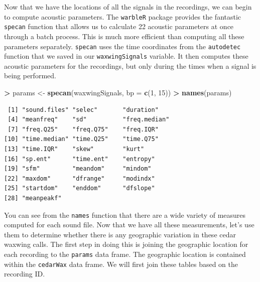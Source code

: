 \documentclass[]{krantz}
\makeatletter
\newenvironment{Shaded}{\begin{snugshade}}{\end{snugshade}}
\newcommand{\CharTok}[1]{\textcolor[rgb]{0.5,0.5,0.5}{#1}}
\newcommand{\DataTypeTok}[1]{\textcolor[rgb]{0.27,0.27,0.27}{#1}}
\newcommand{\DecValTok}[1]{\textcolor[rgb]{0.06,0.06,0.06}{#1}}
\newcommand{\KeywordTok}[1]{\textcolor[rgb]{0.27,0.27,0.27}{\textbf{#1}}}
\newcommand{\NormalTok}[1]{#1}
\newcommand{\OperatorTok}[1]{\textcolor[rgb]{0.43,0.43,0.43}{\textbf{#1}}}
\newcommand{\StringTok}[1]{\textcolor[rgb]{0.5,0.5,0.5}{#1}}
\newenvironment{kframe}{%
\medskip{}
\setlength{\fboxsep}{.8em}
 \def\at@end@of@kframe{}%
 \ifinner\ifhmode%
  \def\at@end@of@kframe{\end{minipage}}%
  \begin{minipage}{\columnwidth}%
 \fi\fi%
 \def\FrameCommand##1{\hskip\@totalleftmargin \hskip-\fboxsep
 \colorbox{shadecolor}{##1}\hskip-\fboxsep
     \hskip-\linewidth \hskip-\@totalleftmargin \hskip\columnwidth}%
 \MakeFramed {\advance\hsize-\width
   \@totalleftmargin\z@ \linewidth\hsize
   \@setminipage}}%
 {\par\unskip\endMakeFramed%
 \at@end@of@kframe}
\renewenvironment{Shaded}{\begin{kframe}}{\end{kframe}}
\makeatother
\begin{document}
Now that we have the locations of all the signals in the recordings, we can begin to compute acoustic parameters. The \texttt{warbleR} package provides the fantastic \texttt{specan} function that allows us to calculate 22 acoustic parameters at once through a batch process. This is much more efficient than computing all these parameters separately. \texttt{specan} uses the time coordinates from the \texttt{autodetec} function that we saved in our \texttt{waxwingSignals} variable. It then computes these acoustic parameters for the recordings, but only during the times when a signal is being performed.

\begin{Shaded}
\begin{Highlighting}[]
\OperatorTok{>}\StringTok{ }\NormalTok{params <-}\StringTok{ }\KeywordTok{specan}\NormalTok{(waxwingSignals, }\DataTypeTok{bp =} \KeywordTok{c}\NormalTok{(}\DecValTok{1}\NormalTok{, }\DecValTok{15}\NormalTok{))}
\OperatorTok{>}\StringTok{ }\KeywordTok{names}\NormalTok{(params)}
\end{Highlighting}
\end{Shaded}

\begin{verbatim}
 [1] "sound.files" "selec"       "duration"   
 [4] "meanfreq"    "sd"          "freq.median"
 [7] "freq.Q25"    "freq.Q75"    "freq.IQR"   
[10] "time.median" "time.Q25"    "time.Q75"   
[13] "time.IQR"    "skew"        "kurt"       
[16] "sp.ent"      "time.ent"    "entropy"    
[19] "sfm"         "meandom"     "mindom"     
[22] "maxdom"      "dfrange"     "modindx"    
[25] "startdom"    "enddom"      "dfslope"    
[28] "meanpeakf"  
\end{verbatim}

You can see from the \texttt{names} function that there are a wide variety of measures computed for each sound file. Now that we have all these measurements, let's use them to determine whether there is any geographic variation in these cedar waxwing calls. The first step in doing this is joining the geographic location for each recording to the \texttt{params} data frame. The geographic location is contained within the \texttt{cedarWax} data frame. We will first join these tables based on the recording ID.

\begin{Shaded}
\end{Shaded}
\end{document}
